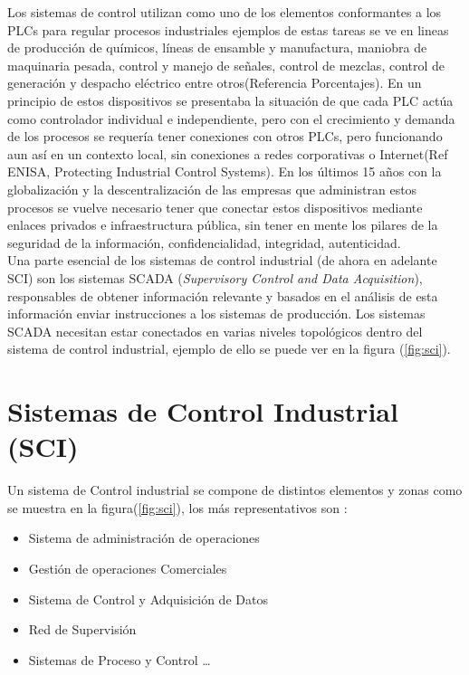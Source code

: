\documentclass[jou,apacite]{apa6}   %
\begin{document}
Los sistemas de control utilizan como uno de los elementos conformantes  a los PLCs  para regular procesos industriales  ejemplos de estas tareas se ve en lineas de producción de químicos, líneas de ensamble y manufactura, maniobra de maquinaria pesada,  control y manejo de señales, control de mezclas, control de generación y despacho eléctrico entre otros(Referencia Porcentajes). En un principio de estos dispositivos se presentaba la situación de que cada PLC actúa como controlador individual e independiente, pero con el crecimiento y demanda de los procesos se requería tener conexiones con otros PLCs, pero funcionando aun así en un contexto local, sin conexiones a redes corporativas o Internet(Ref ENISA, Protecting Industrial Control Systems). En los últimos 15 años con la globalización y la descentralización de las empresas que administran estos procesos se vuelve necesario tener que conectar estos dispositivos mediante enlaces privados e infraestructura pública, sin tener en mente los pilares de la seguridad de la información, confidencialidad, integridad, autenticidad.\\

Una parte esencial de los sistemas de control industrial (de ahora en adelante SCI) son los sistemas SCADA (\textit{Supervisory Control and Data Acquisition}), responsables de obtener información relevante y basados en el análisis de esta información enviar instrucciones a los sistemas de producción. Los sistemas SCADA necesitan estar conectados en varias niveles topológicos dentro del sistema de control industrial,  ejemplo de ello se puede ver en la figura (\ref{fig:sci}). 
\section{Sistemas de Control Industrial (SCI)}
Un sistema de Control industrial se compone de distintos elementos y zonas como se muestra en la figura(\ref{fig:sci}),  los más representativos son :
\begin{itemize}
  \item Sistema de administración de  operaciones
  \item Gestión de operaciones Comerciales
  \item Sistema de Control y Adquisición de Datos
  \item Red de Supervisión
  \item Sistemas de Proceso y Control \ldots
\end{itemize}
\end{document}
